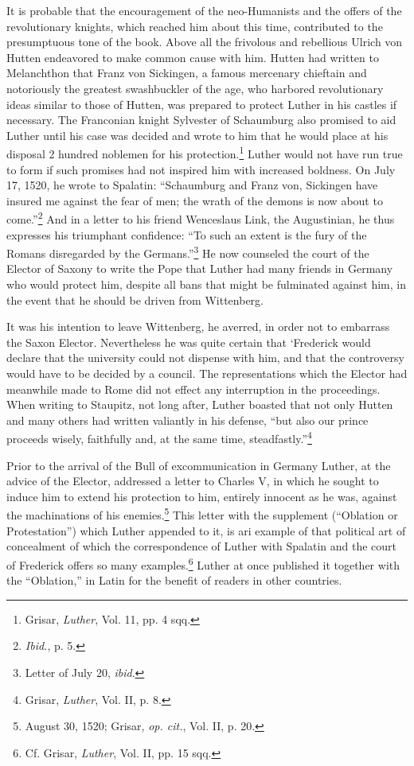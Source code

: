 It is probable that the encouragement of the neo-Humanists and
the offers of the revolutionary knights, which reached him about this
time, contributed to the presumptuous tone of the book. Above
all the frivolous and rebellious Ulrich von Hutten endeavored to
make common cause with him. Hutten had written to Melanchthon
that Franz von Sickingen, a famous mercenary chieftain and notoriously
the greatest swashbuckler of the age, who harbored revolutionary
ideas similar to those of Hutten, was prepared to protect
Luther in his castles if necessary. The Franconian knight Sylvester of
Schaumburg also promised to aid Luther until his case was decided
and wrote to him that he would place at his disposal 2 hundred
noblemen for his protection.\footnote{Grisar, \textit{Luther}, Vol. 11, pp. 4 sqq.}
Luther would not have run true to
form if such promises had not inspired him with increased boldness.
On July 17, 1520, he wrote to Spalatin: “Schaumburg and Franz
von, Sickingen have insured me against the fear of men; the wrath of
the demons is now about to come.”\footnote{\textit{Ibid.}, p. 5.}
And in a letter to his friend
Wenceslaus Link, the Augustinian, he thus expresses his triumphant
confidence: “To such an extent is the fury of the Romans disregarded by
the Germans.”\footnote{Letter of July 20, \textit{ibid}.}
He now counseled the court of the Elector
of Saxony to write the Pope that Luther had many friends in
Germany who would protect him, despite all bans that might be fulminated
against him, in the event that he should be driven from Wittenberg.

It was his intention to leave Wittenberg, he averred, in order not
to embarrass the Saxon Elector. Nevertheless he was quite certain
that ‘Frederick would declare that the university could not dispense with
him, and that the controversy would have to be decided
by a council. The representations which the Elector had meanwhile
made to Rome did not effect any interruption in the proceedings.
When writing to Staupitz, not long after, Luther boasted that not
only Hutten and many others had written valiantly in his defense,
“but also our prince proceeds wisely, faithfully and, at the same time,
steadfastly.”\footnote{Grisar, \textit{Luther}, Vol. II, p. 8.}

Prior to the arrival of the Bull of excommunication in Germany
Luther, at the advice of the Elector, addressed a letter to Charles V,
in which he sought to induce him to extend his protection to him,
entirely innocent as he was, against the machinations of his enemies.\footnote
{August 30, 1520; Grisar, \textit{op. cit.}, Vol. II, p. 20.}
This letter with the supplement (“Oblation or Protestation”) which
Luther appended to it, is ari example of that political art of concealment
of which the correspondence of Luther with Spalatin and the
court of Frederick offers so many examples.\footnote
{Cf. Grisar, \textit{Luther}, Vol. II, pp. 15 sqq.}
Luther at once published
it together with the “Oblation,” in Latin for the benefit of
readers in other countries.

